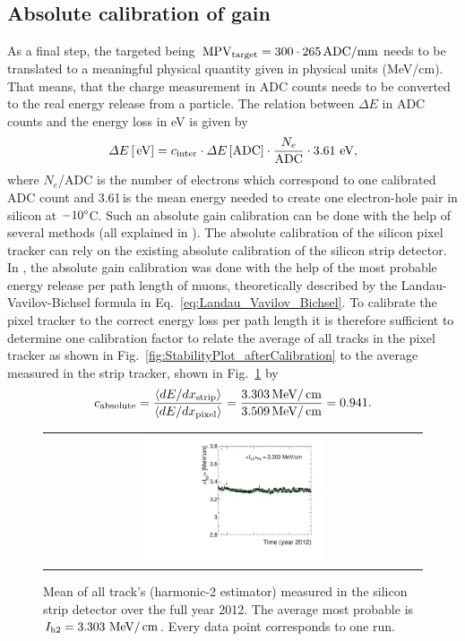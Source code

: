 \subsection*{Absolute calibration of gain}
As a final step, the targeted \mpv being $\,\text{MPV}_{\text{target}}=300 \cdot 265 \,  \text{ADC/mm}$ needs to be translated to a meaningful physical quantity given in physical units (\eg MeV/cm).
That means, that the charge measurement in ADC counts needs to be converted to the real energy release from a particle.
The relation between $\Delta E$ in ADC counts and the energy loss in eV is given by
\begin{equation}
\Delta E\,[\,\text{e}\kern-0.06667em\text{V}] = c_{\text{inter}} \cdot \Delta E\,[\text{ADC}] \cdot \frac{N_e}{\text{ADC}} \cdot 3.61 \, \,\text{e}\kern-0.06667em\text{V},
\end{equation}
where $N_e$/ADC is the number of electrons which correspond to one calibrated ADC count and 3.61\,\ev is the  mean energy needed to create one electron-hole pair in silicon at $-10\degree$C.
Such an absolute gain calibration can be done with the help of several methods (all explained in \cite{bib:Quertenmont_2010}).
The absolute calibration of the silicon pixel tracker can rely on the existing absolute calibration of the silicon strip detector.
In \cite{bib:Quertenmont_2010}, the absolute gain calibration was done with the help of the most probable energy release per path length of muons, 
theoretically described by the Landau-Vavilov-Bichsel formula in Eq.~\eqref{eq:Landau_Vavilov_Bichsel}.  
To calibrate the pixel tracker to the correct energy loss per path length it is therefore sufficient to determine one calibration factor to relate the average \dedx of all tracks in the pixel tracker as shown in 
Fig.~\ref{fig:StabilityPlot_afterCalibration} to the average measured \dedx in the strip tracker, shown in Fig.~\ref{fig:StabilityPlot_Strip} by
\begin{equation}
c_{\text{absolute}} = \frac{\langle dE/dx_{\text{strip}} \rangle}{\langle dE/dx_{\text{pixel}} \rangle} = \frac{3.303 \,\text{Me}\kern-0.06667em\text{V}/\,\text{cm}}{3.509 \,\text{Me}\kern-0.06667em\text{V}/\,\text{cm}} = 0.941.
\end{equation}
\begin{figure}[!t]
  \centering 
  \begin{tabular}{c}
  \includegraphics[width=0.49\textwidth]{figures/analysis/PixelCalibration/StabilityPlot_Strip_afterCalibration_withoutStepFits_NEW.pdf}
  \end{tabular}
  \caption{Mean of all track's \dedx (harmonic-2 estimator) measured in the silicon strip detector over the full year 2012. The average most probable \dedx is $I_{\text{h2}}=3.303\,\,\text{Me}\kern-0.06667em\text{V}/\,\text{cm}$. Every data point corresponds to one run.} 
  \label{fig:StabilityPlot_Strip}
\end{figure}
